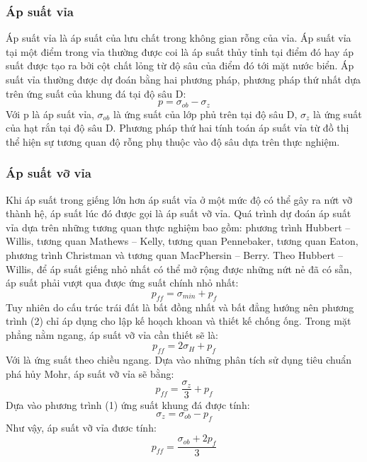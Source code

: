\documentclass[12pt,a4paper]{article}
\begin{document}
\subsubsection{Áp suất vỉa}
Áp suất vỉa là áp suất của lưu chất trong không gian rỗng của vỉa. Áp suất vỉa tại một điểm trong vỉa thường được coi là áp suất thủy tỉnh tại điểm đó hay áp suất được tạo ra bởi cột chất lỏng từ độ sâu của điểm đó tới mặt nước biển.
Áp suất vỉa thường được dự đoán bằng hai phương pháp, phương pháp thứ nhất dựa trên ứng suất của khung đá tại độ sâu D\cite{bourgoyne1991applied}:
\begin{equation}
p = \sigma_{ob}-\sigma_{z}
\end{equation}
Với p là áp suất vỉa, $\sigma_{ob}$ là ứng suất của lớp phủ trên tại độ sâu D, $\sigma_{z}$ là ứng suất của hạt rắn tại độ sâu D. Phương pháp thứ hai tính toán áp suất vỉa từ đồ thị thể hiện sự tương quan độ rỗng phụ thuộc vào độ sâu dựa trên thực nghiệm\cite{bourgoyne1991applied}.
\subsubsection{Áp suất vỡ vỉa}
Khi áp suất trong giếng lớn hơn áp suất vỉa ở một mức độ có thể gây ra nứt vỡ thành hệ, áp suất lúc đó được gọi là áp suất vỡ vỉa. Quá trình dự đoán áp suất vỉa dựa trên những tương quan thực nghiệm bao gồm: phương trình Hubbert – Willis, tương quan Mathews – Kelly, tương quan Pennebaker, tương quan Eaton,  phương trình Christman và tương quan MacPhersin – Berry\cite{bourgoyne1991applied}.
Theo Hubbert – Willis, để áp suất giếng nhỏ nhất có thể mở rộng được những nứt nẻ đã có sẵn, áp suất phải vượt qua được ứng suất chính nhỏ nhất:
\begin{equation}
p_{ff} = \sigma_{min}+p_{f}
\end{equation}
Tuy nhiên do cấu trúc trái đất là bất đồng nhất và bất đẳng hướng nên phương trình (2) chỉ áp dụng cho lập kế hoạch khoan và thiết kế chống ống. Trong mặt phẳng nằm ngang, áp suất vỡ vỉa cần thiết sẽ là:
\begin{equation}
p_{ff} = 2\sigma_{H}+p_{f}
\end{equation}
Với  là ứng suất theo chiều ngang. Dựa vào những phân tích sử dụng tiêu chuẩn phá hủy Mohr\cite{bourgoyne1991applied}, áp suất vỡ vỉa sẽ bằng:
\begin{equation}
p_{ff} = \frac{\sigma_{z}}{3} + p_{f}
\end{equation}
Dựa vào phương trình (1) ứng suất khung đá được tính:
\begin{equation}
\sigma_{z} = \sigma_{ob}-p_{f}
\end{equation}
Như vậy, áp suất vỡ vỉa đươc tính:
\begin{equation}
p_{ff} = \frac{\sigma_{ob}+2p_{f}}{3}
\end{equation}
\end{document}
